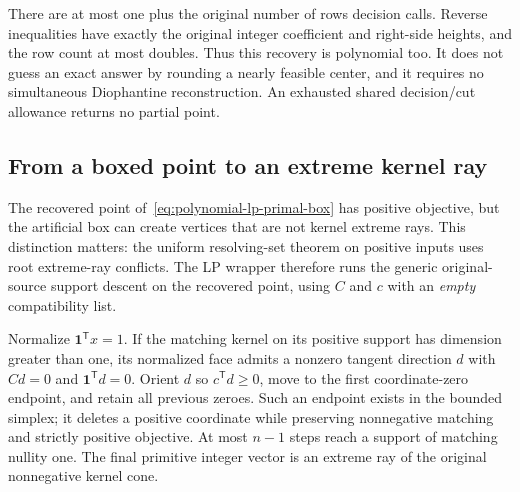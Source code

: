 There are at most one plus the original number of rows decision calls.
Reverse inequalities have exactly the original integer coefficient and
right-side heights, and the row count at most doubles.  Thus this recovery
is polynomial too.  It does not guess an exact answer by rounding a nearly
feasible center, and it requires no simultaneous Diophantine reconstruction.
An exhausted shared decision/cut allowance returns no partial point.

\subsection{From a boxed point to an extreme kernel ray}

The recovered point of~\eqref{eq:polynomial-lp-primal-box} has positive
objective, but the artificial box can create vertices that are not kernel
extreme rays.  This distinction matters: the uniform resolving-set theorem
on positive inputs uses root extreme-ray conflicts.  The LP wrapper therefore
runs the generic original-source support descent on the recovered point,
using $C$ and $c$ with an \emph{empty} compatibility list.

Normalize $\mathbf1^{\mathsf T}x=1$.  If the matching kernel on its positive
support has dimension greater than one, its normalized face admits a nonzero
tangent direction $d$ with $Cd=0$ and $\mathbf1^{\mathsf T}d=0$.  Orient $d$
so $c^{\mathsf T}d\ge0$, move to the first coordinate-zero endpoint, and
retain all previous zeroes.  Such an endpoint exists in the bounded simplex;
it deletes a positive coordinate while preserving nonnegative matching and
strictly positive objective.  At most $n-1$ steps reach a support of matching
nullity one.  The final primitive integer vector is an extreme ray of the
original nonnegative kernel cone.

